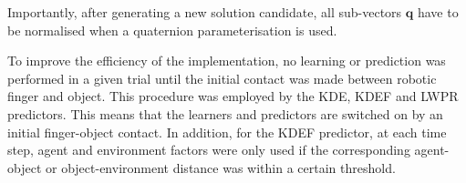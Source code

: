 Importantly, after generating a new solution candidate,
all sub-vectors $\mathbf{q}$ have to be normalised when a quaternion parameterisation is used.


To improve the efficiency of the implementation, no learning or prediction
was performed in a given trial until the initial contact was made between
robotic finger and object. This procedure was employed by
the KDE, KDEF and LWPR predictors. This means that the learners and
predictors are switched on by an initial finger-object contact.
In addition, for the KDEF predictor, at each time step,
agent and environment factors were only used
if the corresponding agent-object or object-environment distance
was within a certain threshold. 
